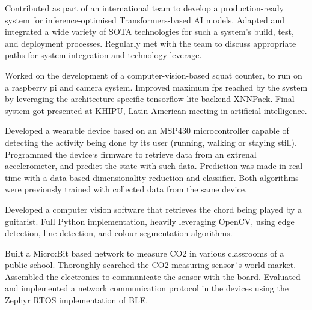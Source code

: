 \documentclass[10pt,a4paper,ragged2e,withhyper]{altacv}
\begin{document}
\begin{paracol}{2}
\bigskip


Contributed as part of an international team to develop a production-ready system for inference-optimised Transformers-based AI models. Adapted and integrated a wide variety of SOTA technologies for such a system's build, test, and deployment processes. Regularly met with the team to discuss appropriate paths for system integration and technology leverage.

\bigskip



Worked on the development of a computer-vision-based squat counter, to run on a raspberry pi and camera system. Improved maximum fps reached by the system by leveraging the architecture-specific tensorflow-lite backend XNNPack. Final system got presented at KHIPU, Latin American meeting in artificial intelligence.

\bigskip

\newpage

Developed a wearable device based on an MSP430 microcontroller capable of detecting the activity being done by its user (running, walking or staying still). Programmed the device`s firmware to retrieve data from an extrenal accelerometer, and predict the state with such data. Prediction was made in real time with a data-based dimensionality reduction and classifier. Both algorithms were previously trained with collected data from the same device.

\bigskip



Developed a computer vision software that retrieves the chord being played by a guitarist. Full Python implementation, heavily leveraging OpenCV,  using edge detection, line detection, and colour segmentation algorithms.



\bigskip

Built a Micro:Bit based network to measure CO2 in various classrooms of a public school. Thoroughly searched the CO2 measuring sensor´s world market. Assembled the electronics to communicate the sensor with the board. Evaluated and implemented a network communication protocol in the devices using the Zephyr RTOS implementation of BLE.


\end{paracol}
\end{document}
